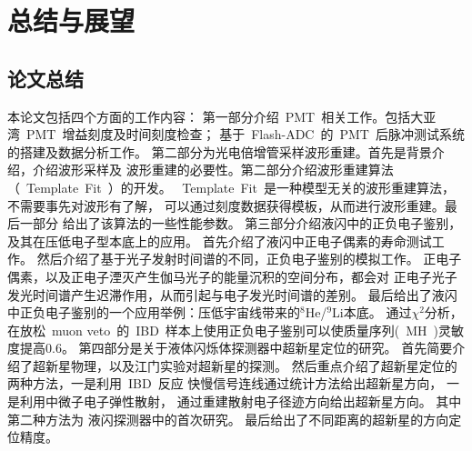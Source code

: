 
\chapter{总结与展望}
\label{chap:chap7}
\section{论文总结}

本论文包括四个方面的工作内容：
第一部分介绍~PMT~相关工作。包括大亚湾~PMT~增益刻度及时间刻度检查；
基于~Flash-ADC~的~PMT~后脉冲测试系统的搭建及数据分析工作。
第二部分为光电倍增管采样波形重建。首先是背景介绍，介绍波形采样及
波形重建的必要性。第二部分介绍波形重建算法（~Template~Fit~）的开发。
~Template~Fit~是一种模型无关的波形重建算法，不需要事先对波形有了解，
可以通过刻度数据获得模板，从而进行波形重建。最后一部分
给出了该算法的一些性能参数。
第三部分介绍液闪中的正负电子鉴别，及其在压低电子型本底上的应用。
首先介绍了液闪中正电子偶素的寿命测试工作。
然后介绍了基于光子发射时间谱的不同，正负电子鉴别的模拟工作。
正电子偶素，以及正电子湮灭产生伽马光子的能量沉积的空间分布，都会对
正电子光子发光时间谱产生迟滞作用，从而引起与电子发光时间谱的差别。
最后给出了液闪中正负电子鉴别的一个应用举例：压低宇宙线带来的$^8$He/$^9$Li本底。
通过$\chi^2$分析，
在放松~muon veto~的~IBD~样本上使用正负电子鉴别可以使质量序列(~MH~)灵敏度提高0.6。
第四部分是关于液体闪烁体探测器中超新星定位的研究。
首先简要介绍了超新星物理，以及江门实验对超新星的探测。
然后重点介绍了超新星定位的两种方法，一是利用~IBD~反应
快慢信号连线通过统计方法给出超新星方向，
一是利用中微子电子弹性散射，
通过重建散射电子径迹方向给出超新星方向。
其中第二种方法为
液闪探测器中的首次研究。
最后给出了不同距离的超新星的方向定位精度。

